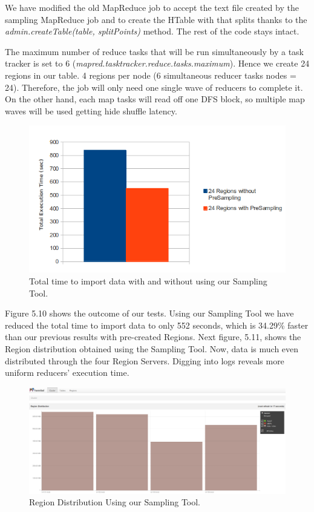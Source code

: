 We have modified the old MapReduce job to accept the text file created by the sampling MapReduce job and to create the HTable with that splits thanks to the \textit{admin.createTable(table, splitPoints)} method. The rest of the code stays intact.
\par
The maximum number of reduce tasks that will be run simultaneously by a task tracker is set to 6 (\textit{mapred.tasktracker.reduce.tasks.maximum}). Hence we create 24 regions in our table. 4 regions per node (6 simultaneous reducer tasks  nodes = 24). Therefore, the job will only need one single wave of reducers to complete it. On the other hand, each map tasks will read off one DFS block, so multiple map waves will be used getting hide shuffle latency.


\begin{figure}[htb]
\centering
\includegraphics[width=1\textwidth]{./images/24regionsChartSampling.png}
\caption{Total time to import data with and without using our Sampling Tool.} \label{fig:regionDistribution3}
\end{figure}

Figure 5.10 shows the outcome of our tests. Using our Sampling Tool we have reduced the total time to import data to only 552 seconds, which is 34.29\% faster than our previous results with pre-created Regions. Next figure, 5.11, shows the Region distribution obtained using the Sampling Tool. Now, data is much even distributed through the four Region Servers. Digging into logs reveals more uniform reducers' execution time.


\begin{figure}[htb]
\centering
\includegraphics[width=1\textwidth]{./images/usingSampling.png}
\caption{Region Distribution Using our Sampling Tool.} \label{fig:regionDistribution2}
\end{figure}


